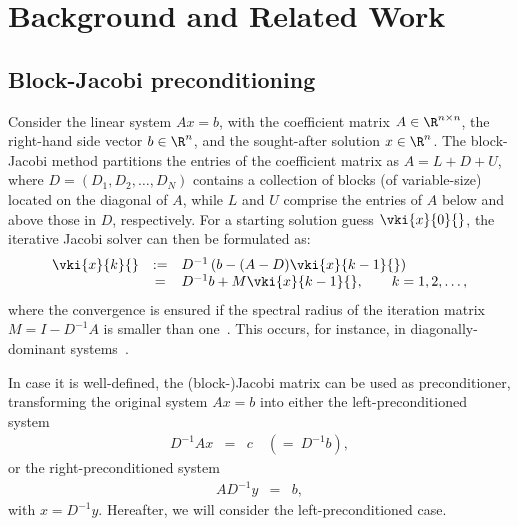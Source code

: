 \section{Background and Related Work}
\label{2017-gje-block-jacobi:sec:s2-background}

\subsection{Block-Jacobi preconditioning}

Consider the linear system
$A x = b$, 
with the coefficient matrix $A\in \R^{n \times n}$, 
the right-hand side vector
$b\in \R^{n}$, 
and the sought-after solution
$x\in \R^{n}$. 
The block-Jacobi method partitions the entries of the
coefficient matrix as $A=L+D+U$,
where $D=(D_1,D_2,\ldots,D_N)$ contains a collection of blocks (of
variable-size) located on the diagonal of $A$,
while $L$ and $U$ comprise the entries of $A$ below and above those in $D$, respectively.
For a starting solution guess $\vki{x}{0}{}$, 
the iterative Jacobi solver can then be formulated as:
\begin{equation}
\begin{array}{rcl}
\vki{x}{k}{} &:=& D^{-1}\left(b-(A-D)\vki{x}{k-1}{}\right)\\
\label{2017-gje-block-jacobi:eq:jacobirelax}
&=& D^{-1}b + M \vki{x}{k-1}{},
\qquad k=1,2,\ldots,
\end{array}
\end{equation}
where the convergence is ensured if the spectral radius of the iteration matrix $M=I-D^{-1}A$ 
is smaller than one~\cite{saad}.
This occurs, for instance, in diagonally-dominant systems~\cite{saad}.

In case it is well-defined, the \mbox{(block-)Jacobi} matrix can be used as preconditioner, 
transforming the original system $Ax=b$ into either the left-preconditioned system
\begin{eqnarray}
D^{-1}Ax&=& c \quad (=~D^{-1}b),
\label{2017-gje-block-jacobi:eq:jacobiprecleft}
\end{eqnarray}
or the right-preconditioned system
\begin{eqnarray}
AD^{-1}y&=& b, 
\label{2017-gje-block-jacobi:eq:jacobiprecright}
\end{eqnarray}
with $x = D^{-1}y$. {Hereafter, we will consider the left-preconditioned case.}


